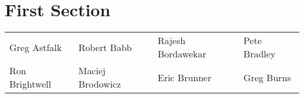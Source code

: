 

\section{First Section}

\begin{centering}
\begin{tabular}{|llll|}
Greg Astfalk &
Robert Babb &
Rajesh Bordawekar &
Pete Bradley \\
Ron Brightwell &
Maciej Brodowicz &
Eric Brunner &
Greg Burns \\
\end{tabular}
\end{centering}



